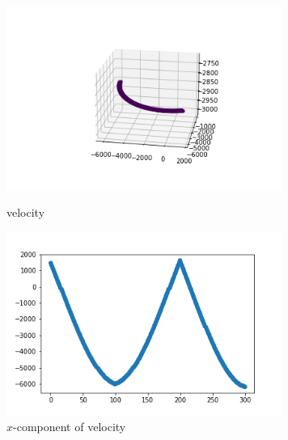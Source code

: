 \documentclass[12pt]{article}
\begin{document}
	\begin{figure}[H]
		\begin{multicols}{2}
			\includegraphics[width=\linewidth, height=6cm]{vs2Bz.png} \caption{velocity} \label{vs2Bz} \par
			\includegraphics[width=\linewidth, height=6cm]{vsx2Bz.png} \caption{$x$-component of velocity} \label{vsx2Bz} \par
		\end{multicols}
	\end{figure}
\end{document}
